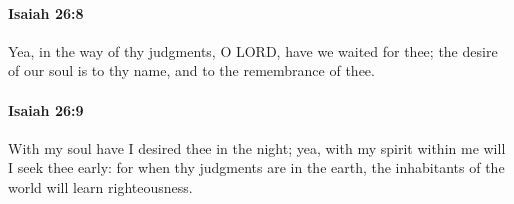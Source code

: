 		\paragraph{Isaiah 26:8} %
			\label{ISAIAH-26-8}

			Yea, in the way of thy judgments, O LORD, have we waited for thee; the desire of our soul is to thy name, and to the remembrance of thee.


		\paragraph{Isaiah 26:9} %
			\label{ISAIAH-26-9}

			With my soul have I desired thee in the night; yea, with my spirit within me will I seek thee early: for when thy judgments are in the earth, the inhabitants of the world will learn righteousness.


